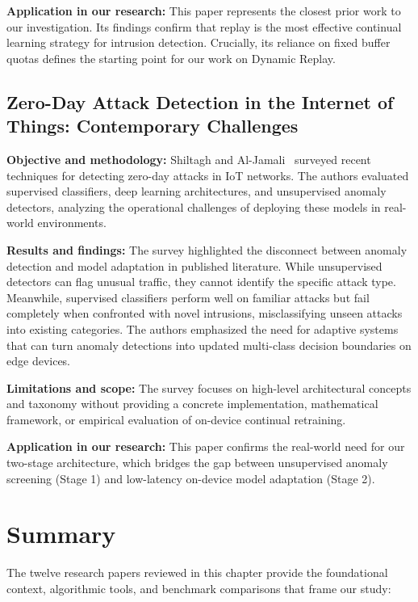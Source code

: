 \smallskip
\noindent\textbf{Application in our research:} This paper represents the closest prior work to our investigation. Its findings confirm that replay is the most effective continual learning strategy for intrusion detection. Crucially, its reliance on fixed buffer quotas defines the starting point for our work on Dynamic Replay.

\subsection{Zero-Day Attack Detection in the Internet of Things: Contemporary Challenges}

\noindent\textbf{Objective and methodology:} Shiltagh and Al-Jamali~\cite{shiltagh2025zeroday} surveyed recent techniques for detecting zero-day attacks in IoT networks. The authors evaluated supervised classifiers, deep learning architectures, and unsupervised anomaly detectors, analyzing the operational challenges of deploying these models in real-world environments.

\smallskip
\noindent\textbf{Results and findings:} The survey highlighted the disconnect between anomaly detection and model adaptation in published literature. While unsupervised detectors can flag unusual traffic, they cannot identify the specific attack type. Meanwhile, supervised classifiers perform well on familiar attacks but fail completely when confronted with novel intrusions, misclassifying unseen attacks into existing categories. The authors emphasized the need for adaptive systems that can turn anomaly detections into updated multi-class decision boundaries on edge devices.

\smallskip
\noindent\textbf{Limitations and scope:} The survey focuses on high-level architectural concepts and taxonomy without providing a concrete implementation, mathematical framework, or empirical evaluation of on-device continual retraining.

\smallskip
\noindent\textbf{Application in our research:} This paper confirms the real-world need for our two-stage architecture, which bridges the gap between unsupervised anomaly screening (Stage 1) and low-latency on-device model adaptation (Stage 2).

\section{Summary}
\label{sec:summary}

The twelve research papers reviewed in this chapter provide the foundational context, algorithmic tools, and benchmark comparisons that frame our study:

